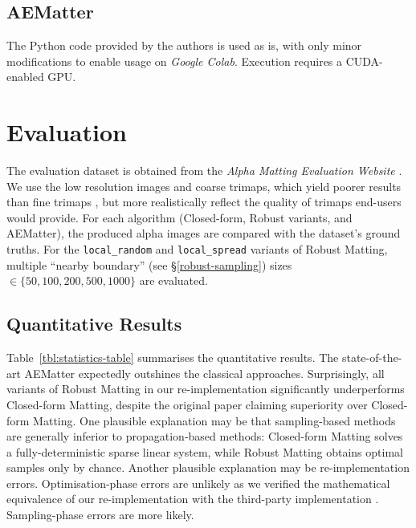 \documentclass{article}
\theoremstyle{definition}
\begin{document}
\begin{multicols}{2}[]
\subsection{AEMatter}
The Python code provided by the authors is used as is, with only minor modifications to enable usage on \emph{Google Colab}. Execution requires a CUDA-enabled GPU.

\section{Evaluation}\label{evaluation}




The evaluation dataset is obtained from the \emph{Alpha Matting Evaluation Website} \cite{alpha-matting-dot-com}. We use the low resolution images and coarse trimaps, which yield poorer results than fine trimaps \cite{robust-matting}, but more realistically reflect the quality of trimaps end-users would provide. For each algorithm (Closed-form, Robust variants, and AEMatter), the produced alpha images are compared with the dataset's ground truths. For the \verb|local_random| and \verb|local_spread| variants of Robust Matting, multiple ``nearby boundary'' (see \S\ref{robust-sampling}) sizes $\in\{50,100,200,500,1000\}$ are evaluated.
\subsection{Quantitative Results}
Table~\ref{tbl:statistics-table} summarises the quantitative results. The state-of-the-art AEMatter expectedly outshines the classical approaches. Surprisingly, all variants of Robust Matting in our re-implementation significantly underperforms Closed-form Matting, despite the original paper claiming superiority over Closed-form Matting. One plausible explanation may be that sampling-based methods are generally inferior to propagation-based methods: Closed-form Matting solves a fully-deterministic sparse linear system, while Robust Matting obtains optimal samples only by chance. Another plausible explanation may be re-implementation errors. Optimisation-phase errors are unlikely as we verified the mathematical equivalence of our re-implementation with the third-party implementation \cite{web:robust-cpp-github}. Sampling-phase errors are more likely.


\end{multicols}
\end{document}
